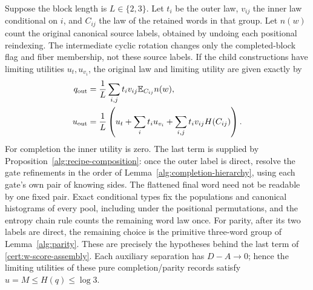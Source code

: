 \documentclass[11pt]{article}
\numberwithin{equation}{section}
\theoremstyle{definition}
\theoremstyle{remark}
\begin{document}
Suppose the block length is $L\in\{2,3\}$.  Let $t_i$ be the outer
law, $v_{ij}$ the inner law conditional on $i$, and $C_{ij}$ the law of
the retained words in that group.  Let $n(w)$ count the original canonical source labels, obtained by
undoing each positional reindexing.  The intermediate cyclic rotation
changes only the completed-block flag and fiber membership, not these
source labels.  If the child constructions
have limiting utilities $u_t,u_{v_i}$, the original law and limiting utility
are given exactly by
\begin{align}
 q_{\rm out}&=\frac1L\sum_{i,j}t_iv_{ij}\mathbb E_{C_{ij}}n(w),
 \label{cert:w-law-assembly}\\
 u_{\rm out}&=\frac1L\left(u_t+\sum_it_i u_{v_i}
                      +\sum_{i,j}t_iv_{ij}H(C_{ij})\right).
 \label{cert:w-score-assembly}
\end{align}
For completion the inner utility is zero.  The last term is supplied by
Proposition~\ref{alg:recipe-composition}: once the outer label is direct,
resolve the gate refinements in the order of
Lemma~\ref{alg:completion-hierarchy}, using each gate's own pair of
knowing sides.  The flattened final word need not be readable by one fixed
pair.  Exact conditional types fix the populations and canonical histograms
of every pool, including under the positional permutations, and the entropy
chain rule counts the remaining word law once.  For parity, after its two
labels are direct, the remaining choice is the primitive three-word group
of Lemma~\ref{alg:parity}.  These are precisely the hypotheses behind the
last term of \eqref{cert:w-score-assembly}.  Each auxiliary separation has
$D-A\to0$; hence the limiting utilities of these pure completion/parity
records satisfy $u=M\le H(q)\le\log3$.
\end{document}
